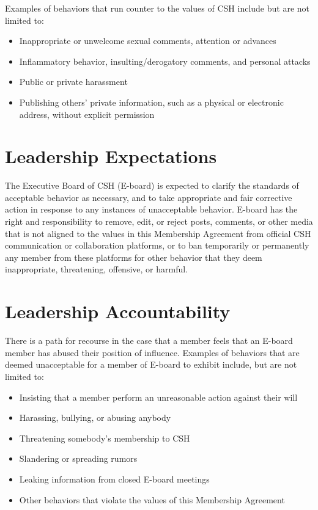 \documentclass{article}
\begin{document}
Examples of behaviors that run counter to the values of CSH include but are
not limited to:

\begin{itemize}
    \item{Inappropriate or unwelcome sexual comments, attention or advances}
    \item{Inflammatory behavior, insulting/derogatory comments, and personal
         attacks}
    \item{Public or private harassment}
    \item{Publishing others’ private information, such as a physical or
         electronic address, without explicit permission}
\end{itemize}

\section*{Leadership Expectations}

The Executive Board of CSH (E-board) is expected to clarify
the standards of acceptable behavior as necessary, and to take appropriate
and fair corrective action in response to any instances of unacceptable
behavior. E-board has the right and responsibility to
remove, edit, or reject posts, comments, or other media that is not aligned
to the values in this Membership Agreement from official CSH communication
or collaboration platforms, or to ban temporarily or permanently any member
from these platforms for other behavior that they deem inappropriate,
threatening, offensive, or harmful.

\section*{Leadership Accountability}

There is a path for recourse in the case that a member feels that an E-board
member has abused their position of influence. Examples of behaviors that are
deemed unacceptable for a member of E-board to exhibit include, but are not
limited to:

\begin{itemize}
    \item{Insisting that a member perform an unreasonable action against
         their will}
    \item{Harassing, bullying, or abusing anybody}
    \item{Threatening somebody’s membership to CSH}
    \item{Slandering or spreading rumors}
    \item{Leaking information from closed E-board meetings}
    \item{Other behaviors that violate the values of this Membership Agreement}
\end{itemize}
\end{document}
